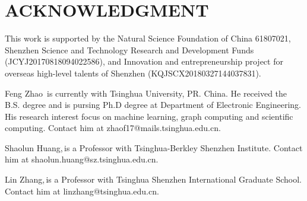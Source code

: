 \documentclass{IEEEcsmag}
\begin{document}
\section{ACKNOWLEDGMENT}

This work is supported by the Natural Science Foundation of China 61807021, Shenzhen Science and Technology Research and Development Funds (JCYJ20170818094022586), and Innovation and entrepreneurship project for overseas high-level talents of Shenzhen (KQJSCX20180327144037831).







\begin{IEEEbiography}{Feng Zhao}{\,} is
currently with Tsinghua University, PR. China. He received the B.S. degree and is pursing Ph.D degree at Department of Electronic Engineering. His research interest focus on machine learning, graph computing and scientific computing. Contact him at zhaof17@mails.tsinghua.edu.cn.
\end{IEEEbiography}

\begin{IEEEbiography}{Shaolun Huang,}{\,}is a Professor with Tsinghua-Berkley Shenzhen Institute. Contact him at shaolun.huang@sz.tsinghua.edu.cn.
\end{IEEEbiography}

\begin{IEEEbiography}{Lin Zhang,}{\,}is a Professor with Tsinghua Shenzhen International Graduate School. Contact him at linzhang@tsinghua.edu.cn.
\end{IEEEbiography}
\end{document}
